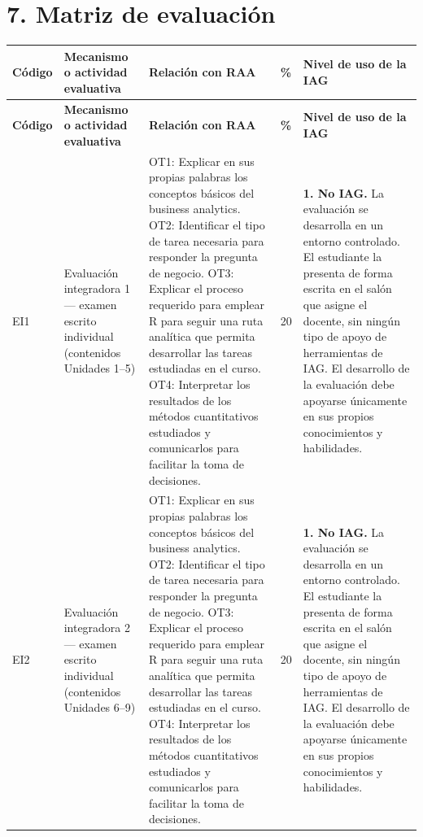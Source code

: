 \documentclass[11pt,a4paper]{article}
\begin{document}
\section*{7. Matriz de evaluación}


\begin{center}
\small
\setlength{\tabcolsep}{3pt}
\begin{longtable}{|p{1.6cm}|p{2.6cm}|p{5.2cm}|p{0.8cm}|p{5.4cm}|}
\hline
\textbf{Código} & \textbf{Mecanismo o actividad evaluativa} & \textbf{Relación con RAA} & \textbf{\%} & \textbf{Nivel de uso de la IAG} \\
\hline
\endfirsthead
\hline
\textbf{Código} & \textbf{Mecanismo o actividad evaluativa} & \textbf{Relación con RAA} & \textbf{\%} & \textbf{Nivel de uso de la IAG} \\
\hline
\endhead

EI1 & Evaluación integradora 1 --- examen escrito individual (contenidos Unidades 1--5) &
OT1: Explicar en sus propias palabras los conceptos básicos del business analytics. OT2: Identificar el tipo de tarea necesaria para responder la pregunta de negocio. OT3: Explicar el proceso requerido para emplear R para seguir una ruta analítica que permita desarrollar las tareas estudiadas en el curso. OT4: Interpretar los resultados de los métodos cuantitativos estudiados y comunicarlos para facilitar la toma de decisiones. &
20 &
\textbf{1. No IAG.} La evaluación se desarrolla en un entorno controlado. El estudiante la presenta de forma escrita en el salón que asigne el docente, sin ningún tipo de apoyo de herramientas de IAG. El desarrollo de la evaluación debe apoyarse únicamente en sus propios conocimientos y habilidades. \\
\hline

EI2 & Evaluación integradora 2 --- examen escrito individual (contenidos Unidades 6--9) &
OT1: Explicar en sus propias palabras los conceptos básicos del business analytics. OT2: Identificar el tipo de tarea necesaria para responder la pregunta de negocio. OT3: Explicar el proceso requerido para emplear R para seguir una ruta analítica que permita desarrollar las tareas estudiadas en el curso. OT4: Interpretar los resultados de los métodos cuantitativos estudiados y comunicarlos para facilitar la toma de decisiones. &
20 &
\textbf{1. No IAG.} La evaluación se desarrolla en un entorno controlado. El estudiante la presenta de forma escrita en el salón que asigne el docente, sin ningún tipo de apoyo de herramientas de IAG. El desarrollo de la evaluación debe apoyarse únicamente en sus propios conocimientos y habilidades. \\
\hline


\end{longtable}
\end{center}
\end{document}
